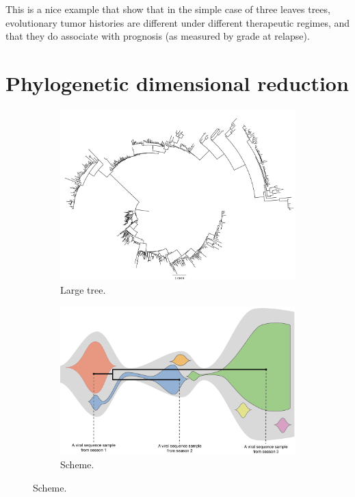 \documentclass[a4paper,11pt]{article}
\begin{document}
This is a nice example that show that in the simple case of three leaves trees, evolutionary tumor histories are different under different therapeutic regimes, and that they do associate with prognosis (as measured by grade at relapse).


\section{Phylogenetic dimensional reduction}\label{sec:flu}



\begin{figure}
    \begin{subfigure}{\linewidth}
    \centering
    \includegraphics[width=4in]{figures/LargeFluTree-NYH3N2-NJ.pdf}
    \caption{Large tree.}
    \end{subfigure}

    \begin{subfigure}{\linewidth}
    \centering
    \includegraphics[width=4in]{figures/influenza_schematic_part1.png}
    \caption{Scheme.}
    \end{subfigure}
   

\end{figure}
\end{document}
